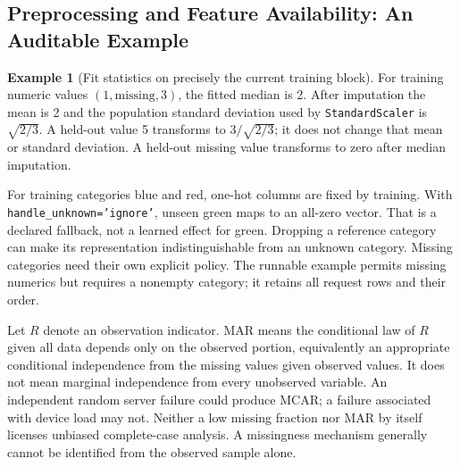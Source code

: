 \documentclass[11pt,twoside]{article}
\numberwithin{equation}{section}
\theoremstyle{plain}
\theoremstyle{definition}
\newtheorem{example}[theorem]{Example}
\theoremstyle{remark}
\begin{document}
\subsection{Preprocessing and Feature Availability: An Auditable Example}
\label{sec:feature-availability}
\begin{example}[Fit statistics on precisely the current training block]
For training numeric values $(1,\mathrm{missing},3)$, the fitted median is 2.
After imputation the mean is 2 and the population standard deviation used by
\texttt{StandardScaler} is $\sqrt{2/3}$. A held-out value 5 transforms to
$3/\sqrt{2/3}$; it does not change that mean or standard deviation.
A held-out missing value transforms to zero after median imputation.

For training categories blue and red, one-hot columns are fixed by training.
With \texttt{handle\_unknown='ignore'}, unseen green maps to an all-zero
vector. That is a declared fallback, not a learned effect for green. Dropping
a reference category can make its representation indistinguishable from an
unknown category. Missing categories need their own explicit policy.
The runnable example permits missing numerics but requires a nonempty category;
it retains all request rows and their order.
\end{example}

Let $R$ denote an observation indicator. MAR means the conditional law of $R$
given all data depends only on the observed portion, equivalently an appropriate
conditional independence from the missing values given observed values.
It does not mean marginal independence from every unobserved variable.
An independent random server failure could produce MCAR; a failure associated
with device load may not. Neither a low missing fraction nor MAR by itself
licenses unbiased complete-case analysis. A missingness mechanism generally
cannot be identified from the observed sample alone.
\end{document}
